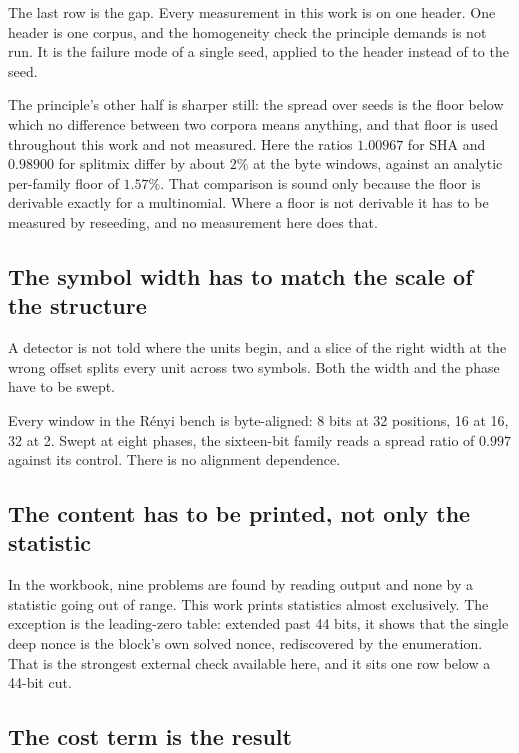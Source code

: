 The last row is the gap. Every measurement in this work is on one header. One header is one corpus, and the homogeneity check the principle demands is not run. It is the failure mode of a single seed, applied to the header instead of to the seed.

The principle's other half is sharper still: the spread over seeds is the floor below which no difference between two corpora means anything, and that floor is used throughout this work and not measured. Here the ratios \(1.00967\) for SHA and \(0.98900\) for splitmix differ by about \(2\%\) at the byte windows, against an analytic per-family floor of \(1.57\%\). That comparison is sound only because the floor is derivable exactly for a multinomial. Where a floor is not derivable it has to be measured by reseeding, and no measurement here does that.

\subsection{The symbol width has to match the scale of the structure}

A detector is not told where the units begin, and a slice of the right width at the wrong offset splits every unit across two symbols. Both the width and the phase have to be swept.

Every window in the Rényi bench is byte-aligned: 8 bits at 32 positions, 16 at 16, 32 at 2. Swept at eight phases, the sixteen-bit family reads a spread ratio of \(0.997\) against its control. There is no alignment dependence.

\subsection{The content has to be printed, not only the statistic}

In the workbook, nine problems are found by reading output and none by a statistic going out of range. This work prints statistics almost exclusively. The exception is the leading-zero table: extended past 44 bits, it shows that the single deep nonce is the block's own solved nonce, rediscovered by the enumeration. That is the strongest external check available here, and it sits one row below a 44-bit cut.

\subsection{The cost term is the result}

